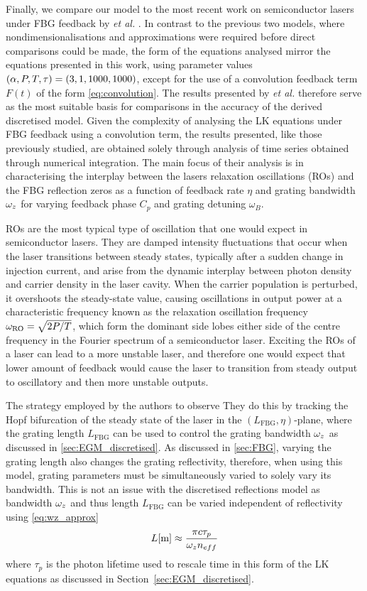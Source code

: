 Finally, we compare our model to the most recent work on semiconductor lasers under FBG feedback by \Skenderas \textit{ et al.} \cite{skenderas2021feedback,skenderas2024impact}. In contrast to the previous two models, where nondimensionalisations and approximations were required before direct comparisons could be made, the form of the equations analysed mirror the equations presented in this work, using parameter values $(\alpha, P, T, \tau) = (3, 1, 1000, 1000)$, except for the use of a convolution feedback term $F(t)$ of the form \eqref{eq:convolution}. The results presented by \Skenderas \textit{ et al.} therefore serve as the most suitable basis for comparisons in the accuracy of the derived discretised model. Given the complexity of analysing the LK equations under FBG feedback using a convolution term, the results presented, like those previously studied, are obtained solely through analysis of time series obtained through numerical integration. The main focus of their analysis is in characterising the interplay between the lasers relaxation oscillations (ROs) and the FBG reflection zeros as a function of feedback rate $\eta$ and grating bandwidth $\omega_z$ for varying feedback phase $C_p$ and grating detuning $\omega_B$. 

ROs are the most typical type of oscillation that one would expect in semiconductor lasers. They are damped intensity fluctuations that occur when the laser transitions between steady states, typically after a sudden change in injection current, and arise from the dynamic interplay between photon density and carrier density in the laser cavity. When the carrier population is perturbed, it overshoots the steady-state value, causing oscillations in output power at a characteristic frequency known as the relaxation oscillation frequency $\omega_\text{RO}=\sqrt{2P/T}$, which form the dominant side lobes either side of the centre frequency in the Fourier spectrum of a semiconductor laser. Exciting the ROs of a laser can lead to a more unstable laser, and therefore one would expect that lower amount of feedback would cause the laser to transition from steady output to oscillatory and then more unstable outputs. 

The strategy employed by the authors to observe They do this by tracking the Hopf bifurcation of the steady state of the laser in the $(L_\text{FBG},\eta)$-plane, where the grating length $L_\text{FBG}$ can be used to control the grating bandwidth $\omega_z$ as discussed in \ref{sec:EGM_discretised}. As discussed in \ref{sec:FBG}, varying the grating length also changes the grating reflectivity, therefore, when using this model, grating parameters must be simultaneously varied to solely vary its bandwidth. This is not an issue with the discretised reflections model as bandwidth $\omega_z$ and thus length $L_\text{FBG}$ can be varied independent of reflectivity using \ref{eq:wz_approx}
%
\begin{equation}
    L [\text{m}] \approx \frac{\pi c \tau_p}{\omega_z n_{eff}} 
\end{equation}
%
where $\tau_p$ is the photon lifetime used to rescale time in this form of the LK equations as discussed in Section~\ref{sec:EGM_discretised}.
%
\par

